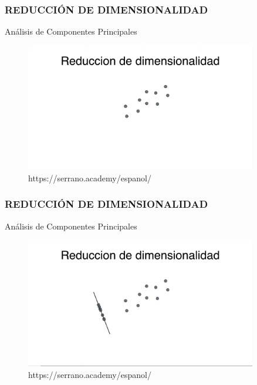 \documentclass{beamer}
\begin{document}
\begin{frame}
\frametitle{REDUCCIÓN DE DIMENSIONALIDAD}
\begin{block}{Análisis de Componentes Principales}	
	\begin{figure}
		\includegraphics[width=0.9\textwidth]{PCA/IMG_3530.jpg}
		\caption{https://serrano.academy/espanol/}
	\end{figure}
\end{block}
\end{frame}

\begin{frame}
	\frametitle{REDUCCIÓN DE DIMENSIONALIDAD}
	\begin{block}{Análisis de Componentes Principales}	
		\begin{figure}
			\includegraphics[width=0.9\textwidth]{PCA/IMG_3531.jpg}
			\caption{https://serrano.academy/espanol/}
		\end{figure}
	\end{block}
\end{frame}
\end{document}
